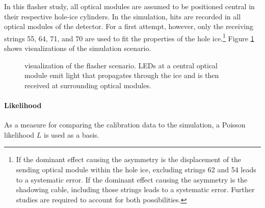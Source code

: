 In this flasher study, all optical modules are assumed to be positioned central in their respective hole-ice cylinders. In the simulation, hits are recorded in all optical modules of the detector. For a first attempt, however, only the receiving strings 55, 64, 71, and 70 are used to fit the properties of the hole ice.\footnote{If the dominant effect causing the asymmetry is the displacement of the sending optical module within the hole ice, excluding strings 62 and 54 leads to a systematic error. If the dominant effect causing the asymmetry is the shadowing cable, including those strings leads to a systematic error. Further studies are required to account for both possibilities.}
Figure \ref{fig:Cahy7eej} shows \steamshovel visualizations of the simulation scenario.

\begin{figure}[htbp]
  \centering
  \hfill
  \hfill
  \hfill
  \begin{minipage}[b]{0.48\textwidth}
  \end{minipage}
  \caption{\steamshovel visualization of the flasher scenario. LEDs at a central optical module emit light that propagates through the ice and is then received at surrounding optical modules.}
  \label{fig:Cahy7eej}
\end{figure}

\paragraph{Likelihood}
As a measure for comparing the calibration data to the simulation, a Poisson likelihood $L$ is used as a basis.

